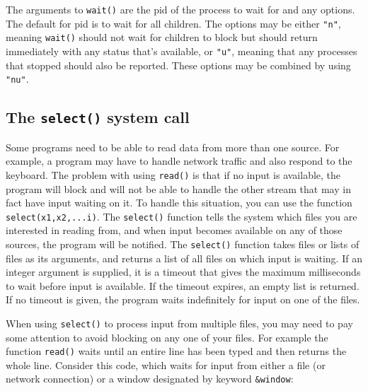 The arguments to \texttt{wait()} are the pid of the process to wait for
and any options. The default for pid is to wait for all children. The
options may be either \texttt{"n"}, meaning
\texttt{wait()} should not wait for children to block but should return
immediately with any status that's available, or
\texttt{"u"}, meaning that any processes
that stopped should also be reported. These options may be combined by
using \texttt{"nu"}.

\subsection*{The \texttt{select()} system call}

Some programs need to be able to read data from more than one source.
For example, a program may have to handle network traffic and also
respond to the keyboard. The problem with using
\texttt{read()} is that if no input is available, the program will
block and will not be able to handle the other stream that may in fact
have input waiting on it. To handle this situation, you can use the
function \texttt{select(x1,x2,...i)}. The
\texttt{select()} function tells the system which files
you are interested in reading from, and when input becomes available on
any of those sources, the program will be notified. The
\texttt{select()} function takes files or lists of files as its
arguments, and returns a list of all files on which input is waiting.
If an integer argument is supplied, it is a timeout that gives the
maximum milliseconds to wait before input is available. If the timeout
expires, an empty list is returned. If no timeout is given, the program
waits indefinitely for input on one of the files.


When using \texttt{select()} to process input from multiple files, you
may need to pay some attention to avoid blocking on any one of your
files. For example the function \texttt{read()} waits until an entire
line has been typed and then returns the whole line. Consider this
code, which waits for input from either a file (or network connection)
or a window designated by keyword \texttt{\&window}:

